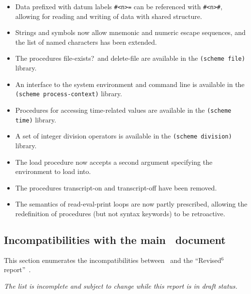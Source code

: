 \begin{itemize}
\item Data prefixed with datum labels {\tt \#<n>=} can be referenced
with {\tt \#<n>\#}, allowing for reading and writing of data with
shared structure.

\item Strings and symbols now allow mnemonic and numeric escape
sequences, and the list of named characters has been extended.

\item The procedures {\cf file-exists?}\ and {\cf delete-file} are available in the
{\tt (scheme file)} library.

\item An interface to the system environment and command line is
available in the {\tt (scheme process-context)} library.

\item Procedures for accessing time-related values are available in the
{\tt (scheme time)} library.

\item A set of integer division operators is available in the
{\tt (scheme division)} library.

\item The {\cf load} procedure now accepts a second argument specifying the environment to
load into.

\item The procedures {\cf transcript-on} and {\cf transcript-off} have been removed.

\item The semantics of read-eval-print loops are now partly prescribed,
allowing the redefinition of procedures (but not syntax keywords) to be retroactive.

\end{itemize}

\subsection*{Incompatibilities with the main \rsixrs\ document}
This section enumerates the incompatibilities between \rsevenrs~and
the ``Revised$^6$ report''~\cite{R6RS}.

{\em The list is incomplete and subject to change while this report is in draft status.}

